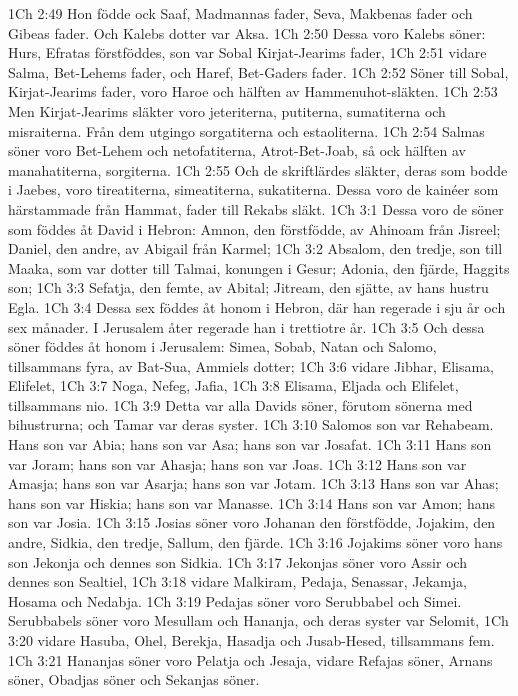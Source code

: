 1Ch 2:49  Hon födde ock Saaf, Madmannas fader, Seva, Makbenas fader och Gibeas fader. Och Kalebs dotter var Aksa.
1Ch 2:50  Dessa voro Kalebs söner: Hurs, Efratas förstföddes, son var Sobal Kirjat-Jearims fader,
1Ch 2:51  vidare Salma, Bet-Lehems fader, och Haref, Bet-Gaders fader.
1Ch 2:52  Söner till Sobal, Kirjat-Jearims fader, voro Haroe och hälften av Hammenuhot-släkten.
1Ch 2:53  Men Kirjat-Jearims släkter voro jeteriterna, putiterna, sumatiterna och misraiterna. Från dem utgingo sorgatiterna och estaoliterna.
1Ch 2:54  Salmas söner voro Bet-Lehem och netofatiterna, Atrot-Bet-Joab, så ock hälften av manahatiterna, sorgiterna.
1Ch 2:55  Och de skriftlärdes släkter, deras som bodde i Jaebes, voro tireatiterna, simeatiterna, sukatiterna. Dessa voro de kainéer som härstammade från Hammat, fader till Rekabs släkt.
1Ch 3:1  Dessa voro de söner som föddes åt David i Hebron: Amnon, den förstfödde, av Ahinoam från Jisreel; Daniel, den andre, av Abigail från Karmel;
1Ch 3:2  Absalom, den tredje, son till Maaka, som var dotter till Talmai, konungen i Gesur; Adonia, den fjärde, Haggits son;
1Ch 3:3  Sefatja, den femte, av Abital; Jitream, den sjätte, av hans hustru Egla.
1Ch 3:4  Dessa sex föddes åt honom i Hebron, där han regerade i sju år och sex månader. I Jerusalem åter regerade han i trettiotre år.
1Ch 3:5  Och dessa söner föddes åt honom i Jerusalem: Simea, Sobab, Natan och Salomo, tillsammans fyra, av Bat-Sua, Ammiels dotter;
1Ch 3:6  vidare Jibhar, Elisama, Elifelet,
1Ch 3:7  Noga, Nefeg, Jafia,
1Ch 3:8  Elisama, Eljada och Elifelet, tillsammans nio.
1Ch 3:9  Detta var alla Davids söner, förutom sönerna med bihustrurna; och Tamar var deras syster.
1Ch 3:10  Salomos son var Rehabeam. Hans son var Abia; hans son var Asa; hans son var Josafat.
1Ch 3:11  Hans son var Joram; hans son var Ahasja; hans son var Joas.
1Ch 3:12  Hans son var Amasja; hans son var Asarja; hans son var Jotam.
1Ch 3:13  Hans son var Ahas; hans son var Hiskia; hans son var Manasse.
1Ch 3:14  Hans son var Amon; hans son var Josia.
1Ch 3:15  Josias söner voro Johanan den förstfödde, Jojakim, den andre, Sidkia, den tredje, Sallum, den fjärde.
1Ch 3:16  Jojakims söner voro hans son Jekonja och dennes son Sidkia.
1Ch 3:17  Jekonjas söner voro Assir och dennes son Sealtiel,
1Ch 3:18  vidare Malkiram, Pedaja, Senassar, Jekamja, Hosama och Nedabja.
1Ch 3:19  Pedajas söner voro Serubbabel och Simei. Serubbabels söner voro Mesullam och Hananja, och deras syster var Selomit,
1Ch 3:20  vidare Hasuba, Ohel, Berekja, Hasadja och Jusab-Hesed, tillsammans fem.
1Ch 3:21  Hananjas söner voro Pelatja och Jesaja, vidare Refajas söner, Arnans söner, Obadjas söner och Sekanjas söner.
